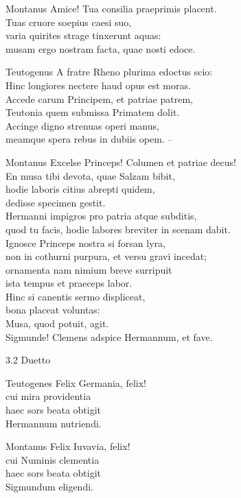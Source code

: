 \documentclass{ees}
\begin{document}
{\begin{lyrics}
  \item[Montanus]
  Amice!
  Tua consilia praeprimis placent.\\
  Tuas cruore soepius caesi suo,\\
  varia quirites strage tinxerunt aquas:\\
  musam ergo nostram facta, quae nosti edoce.

  \item[Teutogenus]
  A fratre Rheno plurima edoctus scio:\\
  Hinc longiores nectere haud opus est moras.\\
  Accede carum Principem, et patriae patrem,\\
  Teutonia quem submissa Primatem dolit.\\
  Accinge digno strenuas operi manus,\\
  meamque spera rebus in dubiis opem. –

  \item[Montanus]
  Excelse Princeps! Columen et patriae decus!\\
  En musa tibi devota, quae Salzam bibit,\\
  hodie laboris citius abrepti quidem,\\
  dedisse specimen gestit.\\
  Hermanni impigros pro patria atque subditis,\\
  quod tu facis, hodie labores breviter in scenam dabit.\\
  Ignosce Princeps nostra si forsan lyra,\\
  non in cothurni purpura, et versu gravi incedat;\\
  ornamenta nam nimium breve surripuit\\
  ista tempus et praeceps labor.\\
  Hinc si canentis sermo displiceat,\\
  bona placeat voluntas:\\
  Musa, quod potuit, agit.\\
  Sigmunde! Clemens adspice Hermannum, et fave.
\end{lyrics}

3.2 Duetto
\begin{lyrics}
  \item[Teutogenes]
  Felix Germania, felix!\\
  cui mira providentia\\
  haec sors beata obtigit\\
  Hermannum nutriendi.

  \item[Montanus]
  Felix Iuvavia, felix!\\
  cui Numinis clementia\\
  haec sors beata obtigit\\
  Sigmundum eligendi.


\end{lyrics}}
\end{document}
